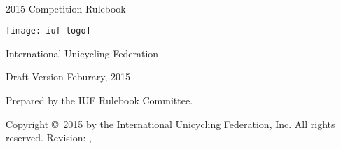 \begin{titlepage}
\centering
\ \\
\vspace{5cm}
{\Huge 2015 Competition Rulebook}
\vspace{5mm}

\texttt{[image: iuf-logo]}

\vspace{5mm}
{\huge International Unicycling Federation}

\vspace{5mm}
{\Large Draft Version \quad Feburary, 2015}

\vspace{55mm}
Prepared by the IUF Rulebook Committee.

\vspace{5mm}
{\small Copyright \copyright\ 2015 by the International Unicycling Federation, Inc. All rights reserved.}
\small{Revision: \gitHash, \gitCommitterDate}

\end{titlepage}
